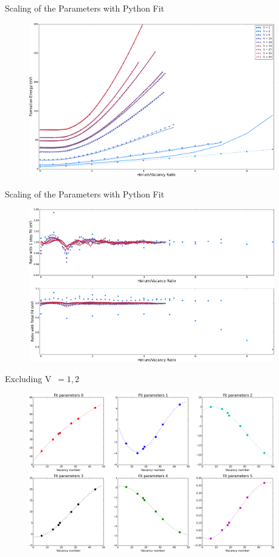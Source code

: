 \documentclass[10pt]{beamer}
\begin{document}
\begin{frame}{Scaling of the Parameters with Python Fit}
	\begin{figure}
        \includegraphics[width=0.95\textwidth]{energyIN}
    \end{figure}
\end{frame}

\begin{frame}{Scaling of the Parameters with Python Fit}
	\begin{figure}
        \includegraphics[width=0.95\textwidth]{ratioIN}
    \end{figure}
\end{frame}

\begin{frame}{Excluding V~$=1, 2$}
	\begin{figure}
        \includegraphics[width=0.95\textwidth]{parametersEX}
    \end{figure}
\end{frame}
\end{document}

